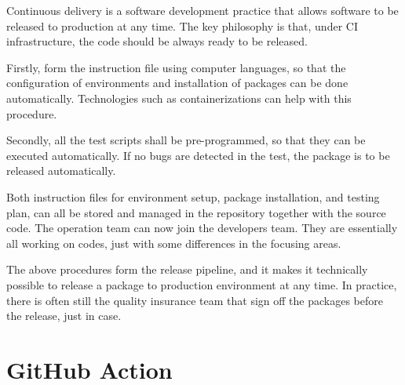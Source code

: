 Continuous delivery is a software development practice that allows software to be released to production at any time. The key philosophy is that, under CI infrastructure, the code should be always ready to be released.

Firstly, form the instruction file using computer languages, so that the configuration of environments and installation of packages can be done automatically. Technologies such as containerizations can help with this procedure.

Secondly, all the test scripts shall be pre-programmed, so that they can be executed automatically. If no bugs are detected in the test, the package is to be released automatically.

Both instruction files for environment setup, package installation, and testing plan, can all be stored and managed in the repository together with the source code. The operation team can now join the developers team. They are essentially all working on codes, just with some differences in the focusing areas.

The above procedures form the release pipeline, and it makes it technically possible to release a package to production environment at any time. In practice, there is often still the quality insurance team that sign off the packages before the release, just in case.


\section{GitHub Action}





















